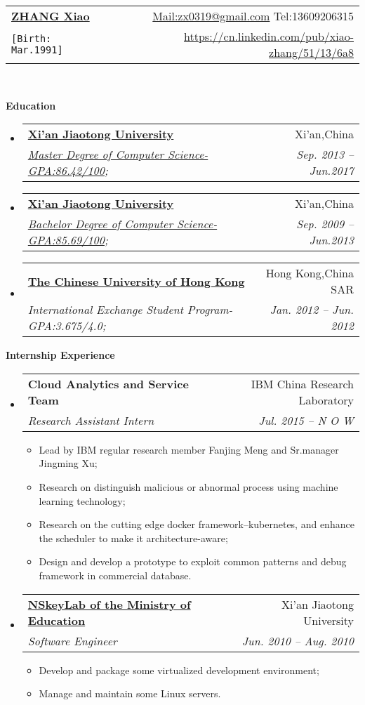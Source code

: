 \documentclass[letterpaper,11pt]{article}
\makeatletter
\newcommand{\resitem}[1]{\item #1 \vspace{-2pt}}
\newcommand{\resheading}[1]{{\large \colorbox{mygrey}{\begin{minipage}{\textwidth}{\textbf{#1 \vphantom{p\^{E}}}}\end{minipage}}}}
\newcommand{\ressubheading}[4]{
\begin{tabular*}{6.5in}{l@{\extracolsep{\fill}}r}
		\textbf{#1} & #2 \\
		\textit{#3} & \textit{#4} \\
\end{tabular*}\vspace{-6pt}}
\makeatother
\begin{document}
\newcommand{\mywebheader}{
\begin{tabular*}{7in}{l@{\extracolsep{\fill}}r}
	\textbf{\href{http://svr6.haohaizi.us/}{\LARGE ZHANG Xiao}} & \href{mailto:zx0319@gmail.com}{Mail:zx0319@gmail.com} Tel:13609206315\\
	{\footnotesize \texttt{{[Birth: Mar.1991]}}} & \href{https://cn.linkedin.com/pub/xiao-zhang/51/13/6a8}{https://cn.linkedin.com/pub/xiao-zhang/51/13/6a8} \\
	\end{tabular*}
\\
\vspace{0.1in}}

\mywebheader

\resheading{Education}
	\begin{itemize}
		\item
			\ressubheading{\href{http://www.xjtu.edu.cn}{Xi'an Jiaotong University}}{Xi'an,China}{\href{http://www.cs.xjtu.edu.cn}{Master Degree of Computer Science-GPA:86.42/100};}{Sep. 2013 -- Jun.2017 }
		\item
			\ressubheading{\href{http://www.xjtu.edu.cn}{Xi'an Jiaotong University}}{Xi'an,China}{\href{http://www.cs.xjtu.edu.cn}{Bachelor Degree of Computer Science-GPA:85.69/100};}{Sep. 2009 --  Jun.2013}
		\item
			\ressubheading{\href{http://www.cuhk.edu.hk}{The Chinese University of Hong Kong}}{Hong Kong,China SAR}{{International Exchange Student Program-GPA:3.675/4.0};}{Jan. 2012 -- Jun. 2012}
	\end{itemize} %

\resheading{Internship Experience}
	\begin{itemize}
		\item 
			\ressubheading{Cloud Analytics and Service Team}{IBM China Research Laboratory}{Research Assistant Intern}{Jul. 2015 -- N O W}
				{ \footnotesize
				\begin{itemize}
					\resitem{Lead by IBM regular research member Fanjing Meng and Sr.manager Jingming Xu;}
					\resitem{Research on distinguish malicious or abnormal process using machine learning technology;}
					\resitem{Research on the cutting edge docker framework--kubernetes, and enhance the scheduler to make it architecture-aware;}
					\resitem{Design and develop a prototype to exploit common patterns and debug framework in commercial database.}
				\end{itemize}
				}
		\item 
			\ressubheading{\href{http://nskeylab.xjtu.edu.cn/}{NSkeyLab of the Ministry of Education}}{Xi'an Jiaotong University}{Software Engineer}{Jun. 2010 -- Aug. 2010}
				{ \footnotesize
				\begin{itemize}
					\resitem{Develop and package some virtualized development environment;}
					\resitem{Manage and maintain some Linux servers.}
				\end{itemize}
				}

	\end{itemize}
	
\end{document}
